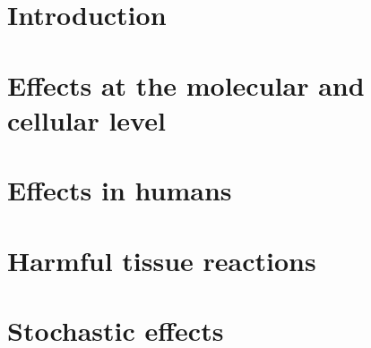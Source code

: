 \section{Introduction}
\section{Effects at the molecular and cellular level}
\section{Effects in humans}
\section{Harmful tissue reactions}
\section{Stochastic effects}
